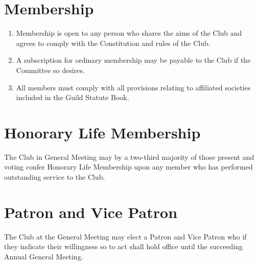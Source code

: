 \documentclass[11pt]{article} %
\begin{document}
\section{Membership}
\begin{enumerate}
	\item Membership is open to any person who shares the aims of the Club and agrees to comply with the Constitution and rules of the Club.
	\item A subscription for ordinary membership may be payable to the Club if the Committee so desires.
	\item All members must comply with all provisions relating to affiliated societies included in the Guild Statute Book.
\end{enumerate}

\section{Honorary Life Membership}
The Club in General Meeting may by a two-third majority of those present and voting confer Honorary Life Membership upon any member who has performed outstanding service to the Club.

\section{Patron and Vice Patron}
The Club at the General Meeting may elect a Patron and Vice Patron who if they indicate their willingness so to act shall hold office until the succeeding Annual General Meeting.
\end{document}
